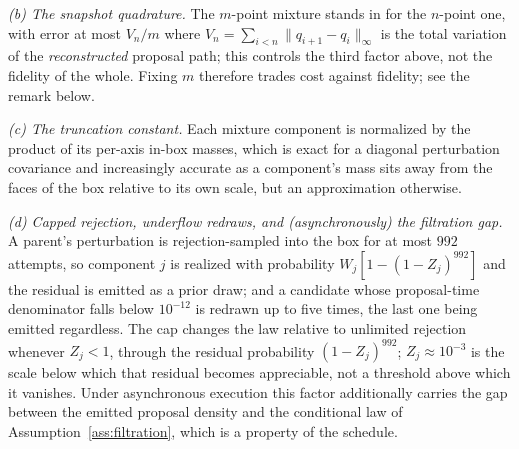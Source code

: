 \documentclass[10pt]{article}
\theoremstyle{plain}
\theoremstyle{definition}
\begin{document}
\emph{(b) The snapshot quadrature.} The $m$-point mixture stands in for the $n$-point one, with error at most $V_n/m$ where $V_n=\sum_{i<n}\|q_{i+1}-q_i\|_\infty$ is the total variation of the \emph{reconstructed} proposal path; this controls the third factor above, not the fidelity of the whole. Fixing $m$ therefore trades cost against fidelity; see the remark below.

\emph{(c) The truncation constant.} Each mixture component is normalized by the product of its per-axis in-box masses, which is exact for a diagonal perturbation covariance and increasingly accurate as a component's mass sits away from the faces of the box relative to its own scale, but an approximation otherwise.

\emph{(d) Capped rejection, underflow redraws, and (asynchronously) the filtration gap.} A parent's perturbation is rejection-sampled into the box for at most $992$ attempts, so component $j$ is realized with probability $W_j[1-(1-Z_j)^{992}]$ and the residual is emitted as a prior draw; and a candidate whose proposal-time denominator falls below $10^{-12}$ is redrawn up to five times, the last one being emitted regardless. The cap changes the law relative to unlimited rejection whenever $Z_j<1$, through the residual probability $(1-Z_j)^{992}$; $Z_j\approx10^{-3}$ is the scale below which that residual becomes appreciable, not a threshold above which it vanishes. Under asynchronous execution this factor additionally carries the gap between the emitted proposal density and the conditional law of Assumption~\ref{ass:filtration}, which is a property of the schedule.
\end{document}
